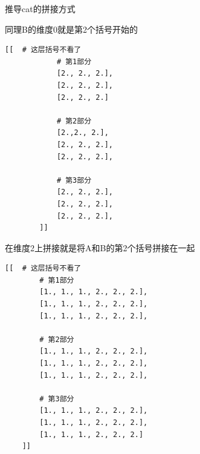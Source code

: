 \begin{derivation}{推导cat的拼接方式}
\begin{enumerate}[label=\arabic*)]
        同理B的维度0就是第2个括号开始的
        \begin{lstlisting}[style=demostyle,numbers=none]
        [[  # 这层括号不看了
            # 第1部分
            [2., 2., 2.],
            [2., 2., 2.],
            [2., 2., 2.]

            # 第2部分
            [2.,2., 2.],
            [2., 2., 2.],
            [2., 2., 2.],

            # 第3部分
            [2., 2., 2.],
            [2., 2., 2.],
            [2., 2., 2.],
        ]]
    \end{lstlisting}

    在维度2上拼接就是将A和B的第2个括号拼接在一起
    \begin{lstlisting}[style=demostyle,numbers=none]
    [[  # 这层括号不看了
        # 第1部分
        [1., 1., 1., 2., 2., 2.],
        [1., 1., 1., 2., 2., 2.],
        [1., 1., 1., 2., 2., 2.],

        # 第2部分
        [1., 1., 1., 2., 2., 2.],
        [1., 1., 1., 2., 2., 2.],
        [1., 1., 1., 2., 2., 2.],

        # 第3部分
        [1., 1., 1., 2., 2., 2.],
        [1., 1., 1., 2., 2., 2.],
        [1., 1., 1., 2., 2., 2.]
    ]]
    \end{lstlisting}
    \end{enumerate}
\end{derivation}


